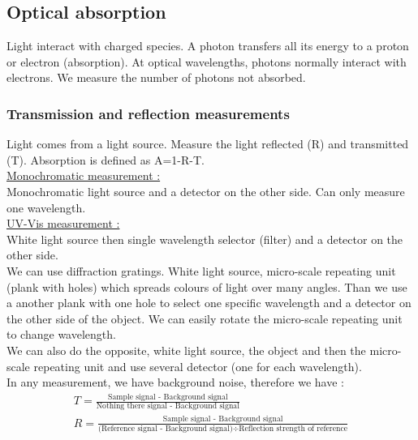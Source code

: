 \documentclass[../main.tex]{subfiles}
\begin{document}
\subsection{Optical absorption}
Light interact with charged species. A photon transfers all its energy to a proton or electron (absorption). At optical wavelengths, photons normally interact with electrons. We measure the number of photons not absorbed. \\

\subsubsection{Transmission and reflection measurements}
Light comes from a light source. Measure the light reflected (R) and transmitted (T). Absorption is defined as A=1-R-T.\\

\quad \underline{Monochromatic measurement :}\\
Monochromatic light source and a detector on the other side. Can only measure one wavelength.\\

\quad \underline{UV-Vis measurement :}\\
White light source then single wavelength selector (filter) and a detector on the other side.\\
We can use diffraction gratings. White light source, micro-scale repeating unit (plank with holes) which spreads colours of light over many angles. Than we use a another plank with one hole to select one specific wavelength and a detector on the other side of the object. We can easily rotate the micro-scale repeating unit to change wavelength.\\
We can also do the opposite, white light source, the object and then the micro-scale repeating unit and use several detector (one for each wavelength).\\

In any measurement, we have background noise, therefore we have : \begin{equation}
    \begin{gathered}
        T = \frac{\text{Sample signal - Background signal}}{\text{Nothing there signal - Background signal}}\\
        R = \frac{\text{Sample signal - Background signal}}{ \text{(Reference signal - Background signal)} \div \text{Reflection strength of reference}}\\
    \end{gathered}
\end{equation}
\end{document}

